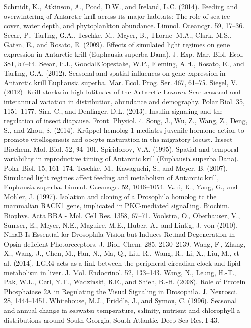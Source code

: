 Schmidt, K., Atkinson, A., Pond, D.W., and Ireland, L.C. (2014). Feeding and overwintering of Antarctic krill across its major habitats: The role of sea ice cover, water depth, and phytoplankton abundance. Limnol. Oceanogr. 59, 17–36.
Seear, P., Tarling, G.A., Teschke, M., Meyer, B., Thorne, M.A., Clark, M.S., Gaten, E., and Rosato, E. (2009). Effects of simulated light regimes on gene expression in Antarctic krill (Euphausia superba Dana). J. Exp. Mar. Biol. Ecol. 381, 57–64.
Seear, P.J., GoodallCopestake, W.P., Fleming, A.H., Rosato, E., and Tarling, G.A. (2012). Seasonal and spatial influences on gene expression in Antarctic krill Euphausia superba. Mar. Ecol. Prog. Ser. 467, 61–75.
Siegel, V. (2012). Krill stocks in high latitudes of the Antarctic Lazarev Sea: seasonal and interannual variation in distribution, abundance and demography. Polar Biol. 35, 1151–1177.
Sim, C., and Denlinger, D.L. (2013). Insulin signaling and the regulation of insect diapause. Front. Physiol. 4.
Song, J., Wu, Z., Wang, Z., Deng, S., and Zhou, S. (2014). Krüppel-homolog 1 mediates juvenile hormone action to promote vitellogenesis and oocyte maturation in the migratory locust. Insect Biochem. Mol. Biol. 52, 94–101.
Spiridonov, V.A. (1995). Spatial and temporal variability in reproductive timing of Antarctic krill (Euphausia superba Dana). Polar Biol. 15, 161–174.
Teschke, M., Kawaguchi, S., and Meyer, B. (2007). Simulated light regimes affect feeding and metabolism of Antarctic krill, Euphausia superba. Limnol. Oceanogr. 52, 1046–1054.
Vani, K., Yang, G., and Mohler, J. (1997). Isolation and cloning of a Drosophila homolog to the mammalian RACK1 gene, implicated in PKC-mediated signalling. Biochim. Biophys. Acta BBA - Mol. Cell Res. 1358, 67–71.
Voolstra, O., Oberhauser, V., Sumser, E., Meyer, N.E., Maguire, M.E., Huber, A., and Lintig, J. von (2010). NinaB Is Essential for Drosophila Vision but Induces Retinal Degeneration in Opsin-deficient Photoreceptors. J. Biol. Chem. 285, 2130–2139.
Wang, F., Zhang, X., Wang, J., Chen, M., Fan, N., Ma, Q., Liu, R., Wang, R., Li, X., Liu, M., et al. (2014). LGR4 acts as a link between the peripheral circadian clock and lipid metabolism in liver. J. Mol. Endocrinol. 52, 133–143.
Wang, N., Leung, H.-T., Pak, W.L., Carl, Y.T., Wadzinski, B.E., and Shieh, B.-H. (2008). Role of Protein Phosphatase 2A in Regulating the Visual Signaling in Drosophila. J. Neurosci. 28, 1444–1451.
Whitehouse, M.J., Priddle, J., and Symon, C. (1996). Seasonal and annual change in seawater temperature, salinity, nutrient and chlorophyll a distributions around South Georgia, South Atlantic. Deep-Sea Res. I 43.
